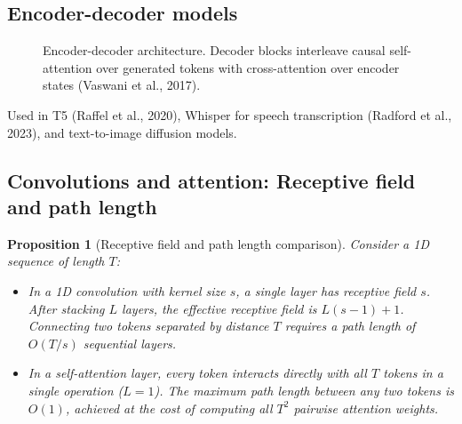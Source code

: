 \documentclass[11pt,a4paper]{article}
\newcommand{\slides}[1]{\par\nopagebreak\noindent{\normalfont\small\emph{(slides #1)}}\par\nopagebreak\vspace{2pt}}
\theoremstyle{definition}
\theoremstyle{plain}
\newtheorem{proposition}[definition]{Proposition}
\begin{document}
\subsection{Encoder-decoder models}\slides{70 / 84}
\begin{figure}[H]
\centering
{}
\caption{Encoder-decoder architecture. Decoder blocks interleave causal self-attention over generated tokens with cross-attention over encoder states (Vaswani et al., 2017).}\label{fig:enc_dec_vis}
\end{figure}
Used in T5 (Raffel et al., 2020), Whisper for speech transcription (Radford et al., 2023), and text-to-image diffusion models.

\subsection{Convolutions and attention: Receptive field and path length}\slides{71 / 84}
\begin{proposition}[Receptive field and path length comparison]
Consider a 1D sequence of length $T$:
\begin{itemize}
\item In a 1D convolution with kernel size $s$, a single layer has receptive field $s$. After stacking $L$ layers, the effective receptive field is $L(s - 1) + 1$. Connecting two tokens separated by distance $T$ requires a path length of $O(T / s)$ sequential layers.
\item In a self-attention layer, every token interacts directly with all $T$ tokens in a single operation ($L=1$). The maximum path length between any two tokens is $O(1)$, achieved at the cost of computing all $T^2$ pairwise attention weights.
\end{itemize}
\end{proposition}
\end{document}
